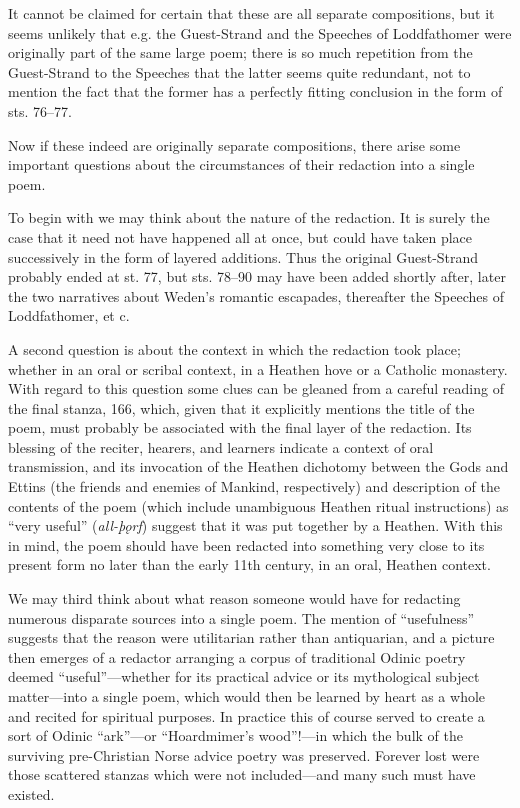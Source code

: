 It cannot be claimed for certain that these are all separate compositions, but it seems unlikely that e.g. the Guest-Strand and the Speeches of Loddfathomer were originally part of the same large poem; there is so much repetition from the Guest-Strand to the Speeches that the latter seems quite redundant, not to mention the fact that the former has a perfectly fitting conclusion in the form of sts. 76–77.

Now if these indeed are originally separate compositions, there arise some important questions about the circumstances of their redaction into a single poem.

To begin with we may think about the nature of the redaction.  It is surely the case that it need not have happened all at once, but could have taken place successively in the form of layered additions.  Thus the original Guest-Strand probably ended at st. 77, but sts. 78–90 may have been added shortly after, later the two narratives about Weden’s romantic escapades, thereafter the Speeches of Loddfathomer, et c.

A second question is about the context in which the redaction took place; whether in an oral or scribal context, in a Heathen hove or a Catholic monastery.  With regard to this question some clues can be gleaned from a careful reading of the final stanza, 166, which, given that it explicitly mentions the title of the poem, must probably be associated with the final layer of the redaction.  Its blessing of the reciter, hearers, and learners indicate a context of oral transmission, and its invocation of the Heathen dichotomy between the Gods and Ettins (the friends and enemies of Mankind, respectively) and description of the contents of the poem (which include unambiguous Heathen ritual instructions) as “very useful” (\emph{all-þǫrf}) suggest that it was put together by a Heathen.  With this in mind, the poem should have been redacted into something very close to its present form no later than the early 11th century, in an oral, Heathen context.

We may third think about what reason someone would have for redacting numerous disparate sources into a single poem.  The mention of “usefulness” suggests that the reason were utilitarian rather than antiquarian, and a picture then emerges of a redactor arranging a corpus of traditional Odinic poetry deemed “useful”—whether for its practical advice or its mythological subject matter—into a single poem, which would then be learned by heart as a whole and recited for spiritual purposes.  In practice this of course served to create a sort of Odinic “ark”—or “Hoardmimer’s wood”!—in which the bulk of the surviving pre-Christian Norse advice poetry was preserved.  Forever lost were those scattered stanzas which were not included—and many such must have existed.

